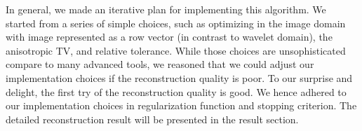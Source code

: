 \documentclass[12pt]{article}
\newcommand{\noin}{\noindent}
\begin{document}
\vspace{0.2in}
\noin In general, we made an iterative plan for implementing this algorithm. We started from a series of simple choices, such as optimizing in the image domain with image represented as a row vector (in contrast to wavelet domain), the anisotropic TV, and relative tolerance. While those choices are unsophisticated compare to many advanced tools, we reasoned that we could adjust our implementation choices if the reconstruction quality is poor. To our surprise and delight, the first try of the reconstruction quality is good. We hence adhered to our implementation choices in regularization function and stopping criterion. The detailed reconstruction result will be presented in the result section. 
\newpage
{}

\end{document}
